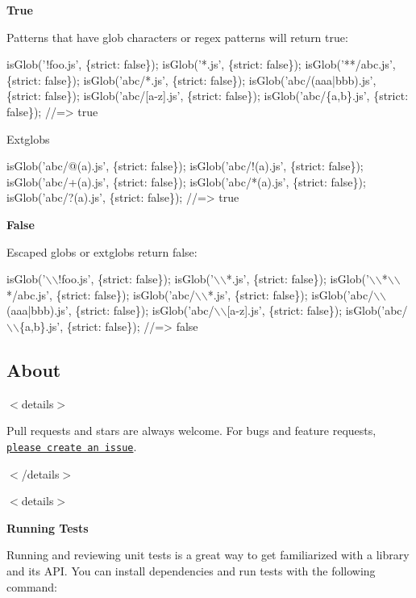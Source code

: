 {\bfseries True}

Patterns that have glob characters or regex patterns will return {\ttfamily true}\+:


\begin{DoxyCode}
isGlob('!foo.js', \{strict: false\});
isGlob('*.js', \{strict: false\});
isGlob('**/abc.js', \{strict: false\});
isGlob('abc/*.js', \{strict: false\});
isGlob('abc/(aaa|bbb).js', \{strict: false\});
isGlob('abc/[a-z].js', \{strict: false\});
isGlob('abc/\{a,b\}.js', \{strict: false\});
//=> true
\end{DoxyCode}


Extglobs


\begin{DoxyCode}
isGlob('abc/@(a).js', \{strict: false\});
isGlob('abc/!(a).js', \{strict: false\});
isGlob('abc/+(a).js', \{strict: false\});
isGlob('abc/*(a).js', \{strict: false\});
isGlob('abc/?(a).js', \{strict: false\});
//=> true
\end{DoxyCode}


{\bfseries False}

Escaped globs or extglobs return {\ttfamily false}\+:


\begin{DoxyCode}
isGlob('\(\backslash\)\(\backslash\)!foo.js', \{strict: false\});
isGlob('\(\backslash\)\(\backslash\)*.js', \{strict: false\});
isGlob('\(\backslash\)\(\backslash\)*\(\backslash\)\(\backslash\)*/abc.js', \{strict: false\});
isGlob('abc/\(\backslash\)\(\backslash\)*.js', \{strict: false\});
isGlob('abc/\(\backslash\)\(\backslash\)(aaa|bbb).js', \{strict: false\});
isGlob('abc/\(\backslash\)\(\backslash\)[a-z].js', \{strict: false\});
isGlob('abc/\(\backslash\)\(\backslash\)\{a,b\}.js', \{strict: false\});
//=> false
\end{DoxyCode}


\subsection*{About}

$<$details$>$

Pull requests and stars are always welcome. For bugs and feature requests, \href{../../issues/new}{\tt please create an issue}.

$<$/details$>$

$<$details$>$ 

{\bfseries Running Tests}

Running and reviewing unit tests is a great way to get familiarized with a library and its A\+PI. You can install dependencies and run tests with the following command\+:


